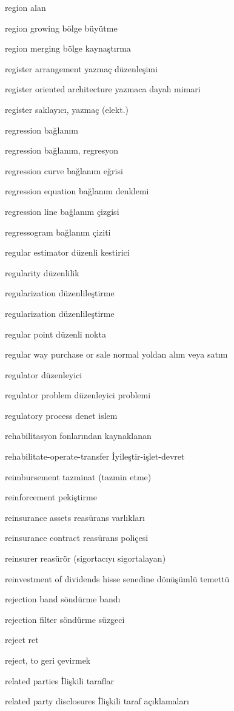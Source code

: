 \documentclass[12pt,fleqn]{article}\usepackage{../../common}
\begin{document}
region alan

region growing bölge büyütme

region merging bölge kaynaştırma

register arrangement yazmaç düzenleşimi

register oriented architecture yazmaca dayalı mimari

register saklayıcı, yazmaç (elekt.)

regression bağlanım

regression bağlanım, regresyon

regression curve bağlanım eğrisi

regression equation bağlanım denklemi

regression line bağlanım çizgisi

regressogram bağlanım çiziti

regular estimator düzenli kestirici

regularity düzenlilik

regularization düzenlileştirme

regularization düzenlileştirme

regular point düzenli nokta

regular way purchase or sale normal yoldan alım veya satım

regulator düzenleyici

regulator problem düzenleyici problemi

regulatory process denet islem

rehabilitasyon fonlarından kaynaklanan

rehabilitate-operate-transfer İyileştir-işlet-devret

reimbursement tazminat (tazmin etme)

reinforcement pekiştirme

reinsurance assets reasürans varlıkları

reinsurance contract reasürans poliçesi

reinsurer reasürör (sigortacıyı sigortalayan)

reinvestment of dividends hisse senedine dönüşümlü temettü

rejection band söndürme bandı

rejection filter söndürme süzgeci

reject ret

reject, to geri çevirmek

related parties İlişkili taraflar

related party disclosures İlişkili taraf açıklamaları
\end{document}
